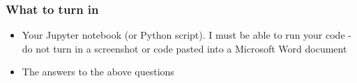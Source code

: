 \documentclass[]{article}
\begin{document}
\hypertarget{what-to-turn-in}{%
\subsubsection{What to turn in}\label{what-to-turn-in}}

\begin{itemize}
\item
  Your Jupyter notebook (or Python script). I must be able to run your
  code - do not turn in a screenshot or code pasted into a Microsoft
  Word document
\item
  The answers to the above questions
\end{itemize}
\end{document}

